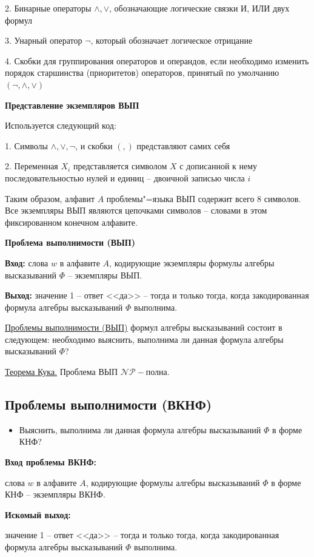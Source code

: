 2. Бинарные операторы $\land,\lor$, обозначающие логические связки И, ИЛИ двух формул

3. Унарный оператор $\lnot$, который обозначает логическое отрицание

4. Скобки для группирования операторов и операндов, если необходимо изменить порядок старшинства (приоритетов) операторов, принятый по умолчанию $(\lnot,\land,\lor)$

\textbf{Представление экземпляров ВЫП}

Используется следующий код:

1. Символы $\land,\lor,\lnot$, и скобки $(,)$ представляют самих себя

2. Переменная $X_i$ представляется символом $X$ с дописанной к нему последовательностью нулей и единиц -- двоичной записью числа $i$

Таким образом, алфавит $A$ проблемы"=языка ВЫП содержит всего 8 символов. Все экземпляры ВЫП являются цепочками символов -- словами в этом фиксированном конечном алфавите.

\textbf{Проблема выполнимости (ВЫП)}

\textbf{Вход:} слова $w$ в алфавите $A$, кодирующие экземпляры формулы алгебры высказываний $\Phi$ -- экземпляры ВЫП.

\textbf{Выход:} значение 1 -- ответ <<да>> -- тогда и только тогда, когда закодированная формула алгебры высказываний $\Phi$ выполнима.

\underline{Проблемы выполнимости (ВЫП)} формул алгебры высказываний состоит в следующем: необходимо выяснить, выполнима ли данная формула алгебры высказываний $\Phi$?

\underline{Теорема Кука.} Проблема ВЫП $\mathscr{NP}-$полна.

\subsection*{Проблемы выполнимости (ВКНФ)}
\begin{itemize}
    \item Выяснить, выполнима ли данная формула алгебры высказываний $\Phi$ в форме КНФ?
\end{itemize}

\textbf{Вход проблемы ВКНФ:}

слова $w$ в алфавите $A$, кодирующие формулы алгебры высказываний $\Phi$ в форме КНФ -- экземпляры ВКНФ.

\textbf{Искомый выход:}

значение 1 -- ответ <<да>> -- тогда и только тогда, когда закодированная формула алгебры высказываний $\Phi$ выполнима.

